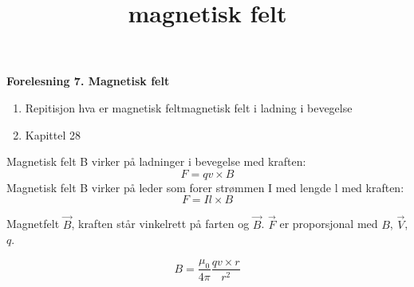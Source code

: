 \documentclass{article}
\title{magnetisk felt}
\begin{document}
\begin{flushleft}
    

\textbf{Forelesning 7. Magnetisk felt}\par
\bigskip
\begin{enumerate}
    \item Repitisjon hva er magnetisk feltmagnetisk felt i ladning i bevegelse
    \item Kapittel 28
\end{enumerate}
\bigskip

Magnetisk felt B virker på ladninger i bevegelse med kraften:
\[F=qv \times B\]
Magnetisk felt B virker på leder som forer strømmen I med lengde l med kraften:
\[F=Il \times B\]

\bigskip

Magnetfelt $\vec{B}$, kraften står vinkelrett på farten og $\vec{B}$.
$\vec{F}$ er proporsjonal med $B$, $\vec{V}$, $q$. 

\bigskip

\[B=  \frac{ \mu_0 }{4\pi} \frac{qv \times r}{r^2} \]



\end{flushleft}
\end{document}
